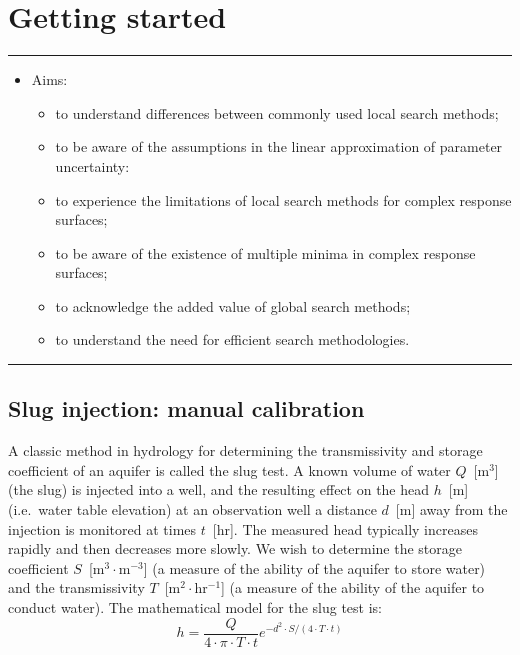 \chapter{Getting started}
\thispagestyle{fancy}
\label{ch:getting-started}



\hrule
\begin{itemize}
\footnotesize
\item[]{Aims:}
\begin{itemize}
\item{to understand differences between commonly used local search methods;}
\item{to be aware of the assumptions in the linear approximation of parameter uncertainty:}
\item{to experience the limitations of local search methods for complex response surfaces;}
\item{to be aware of the existence of multiple minima in complex response surfaces;}
\item{to acknowledge the added value of global search methods;}
\item{to understand the need for efficient search methodologies.}
\end{itemize}
\end{itemize}
\hrule
\vspace{1em}

\section{Slug injection: manual calibration}

A classic method in hydrology for determining the transmissivity and storage coefficient of an aquifer is called the slug test. A known volume of water $Q$~[\textsf{m$^3$}] (the slug) is injected into a well, and the resulting effect on the head $h$~[\textsf{m}] (i.e.~water table elevation) at an observation well a distance $d$~[\textsf{m}] away from the injection is monitored at times $t$~[\textsf{hr}]. The measured head typically increases rapidly and then decreases more slowly. We wish to determine the storage coefficient $S$~[\textsf{m$^3\cdot{}$m$^{-3}$}] (a measure of the ability of the aquifer to store water) and the transmissivity $T$~[\textsf{m$^2\cdot{}$hr$^{-1}$}] (a measure of the ability of the aquifer to conduct water). The mathematical model for the slug test is:
\begin{equation}
\label{eq:slug-inj}
h=\frac{Q}{4\cdot{}\pi\cdot{}T\cdot{}t}e^{-d^2\cdot{}S/(4\cdot{}T\cdot{}t)}
\end{equation}



